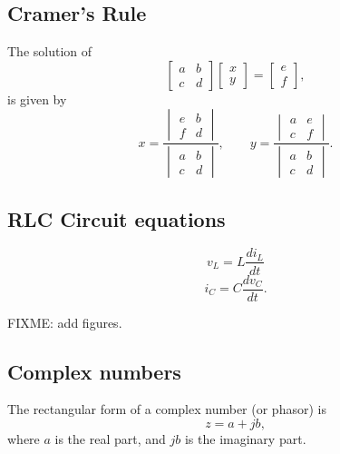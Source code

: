 \documentclass[letterpaper]{scrartcl}
\begin{document}
\subsection*{Cramer's Rule}
The solution of
\begin{equation}\label{eqn:karlCircuitsCheatSheet:380}
\begin{bmatrix}
a & b \\
c & d
\end{bmatrix}
\begin{bmatrix}
x \\
y
\end{bmatrix}
=
\begin{bmatrix}
e \\
f
\end{bmatrix},
\end{equation}
is given by
\begin{equation}\label{eqn:karlCircuitsCheatSheet:100}
x = \frac{
   \begin{vmatrix}
   e & b \\
   f & d
   \end{vmatrix}
}{
   \begin{vmatrix}
   a & b \\
   c & d
   \end{vmatrix}
},
\qquad
y = \frac{
   \begin{vmatrix}
   a & e \\
   c & f
   \end{vmatrix}
}{
   \begin{vmatrix}
   a & b \\
   c & d
   \end{vmatrix}
}.
\end{equation}
\subsection*{RLC Circuit equations}
\begin{equation}\label{eqn:karlCircuitsCheatSheet:120}
v_L = L \frac{di_L}{dt}
\end{equation}
\begin{equation}\label{eqn:karlCircuitsCheatSheet:140}
i_C = C \frac{dv_C}{dt}.
\end{equation}

FIXME: add figures.

\subsection*{Complex numbers}
The rectangular form of a complex number (or phasor) is
\begin{equation}\label{eqn:karlCircuitsCheatSheet:160}
z = a + j b,
\end{equation}
where \( a \) is the real part, and \( j b \) is the imaginary part.
\end{document}
